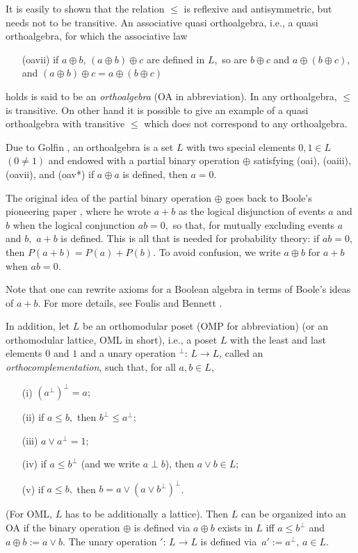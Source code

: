 It is easily to  shown that the relation $\le$ is reflexive and
antisymmetric,
but needs not to be transitive. An associative quasi orthoalgebra,
i.e., a quasi orthoalgebra, for which the associative law
\begin{enumerate}
\item[{\rm (oavii)}] if $a \oplus b,\, (a\oplus b) \oplus c$ are defined
in $L,$ so are $b \oplus c$ and $a \oplus(b \oplus c),$ and $(a \oplus b)
\oplus c = a \oplus ( b \oplus c)$
\end{enumerate}
holds is said to be an {\it orthoalgebra}  (OA in abbreviation). In any
orthoalgebra, $\le$ is
transitive. On other hand it is possible to give an example of a quasi
orthoalgebra with transitive $\le$ which does not correspond to  any
orthoalgebra.

Due to Golfin \cite{Gol}, an orthoalgebra is a set $L$ with two special
elements $0,1 \in L$ $(0\ne 1)$ and endowed with a partial  binary
operation
$\oplus $
satisfying (oai), (oaiii), (oavii), and (oav*) if
$a \oplus a$ is defined, then $a = 0.$

The original idea of the partial binary operation $\oplus$  goes back
to Boole's pioneering paper \cite{Bool}, where he wrote $a + b$ as the logical
disjunction of events $a$ and $b$ when the logical conjunction $ab = 0,$
so that, for mutually excluding events $a$ and $b,$ $a + b$ is defined.
This is all that is needed for probability theory: if $ab = 0,$  then
$P(a+b) = P(a) + P(b).$ To avoid confusion, we write $a \oplus b$ for $a+b$
when $ab = 0.$

Note that one can rewrite axioms for a Boolean algebra in terms of
Boole's
ideas of $a+b$. For more details, see Foulis and Bennett \cite{FB}.




In addition, let $L$ be an orthomodular poset (OMP for abbreviation)
(or an orthomodular lattice, OML in short), i.e., a poset $L$ with the
least
and last elements $0$ and $1$ and a unary operation $^\bot :\, L \to L$,
called an {\it orthocomplementation}, such that, for all $a,b \in L$,
\begin{enumerate}
\item[{\rm (i)}]  $(a^\bot )^\bot = a;$\vspace{-2mm}
\item[{\rm (ii)}] if $a \le b,$ then $b^\bot \le a^\bot;$\vspace{-2mm}
\item[{\rm (iii)}] $a \vee a^\bot = 1;$\vspace{-2mm}
\item[{\rm (iv)}] if $a \le b^\bot$ (and we write $a \perp b$),
then $a \vee b \in L;$\vspace{-2mm}
\item[{\rm (v)}] if $a \le b,$ then $b = a \vee (a \vee b^\bot)^\bot$.
\end{enumerate}
(For OML, $L$ has to be additionally a lattice).
Then $L$ can be organized into an OA if the binary operation $\oplus$
is defined via $a \oplus b$ exists in $L$
iff $ a\le b^\bot$ and $a \oplus b :=
a \vee b$. The unary operation $':\, L \to L$ is defined via\
$a' := a^\bot, \, a \in L.$

